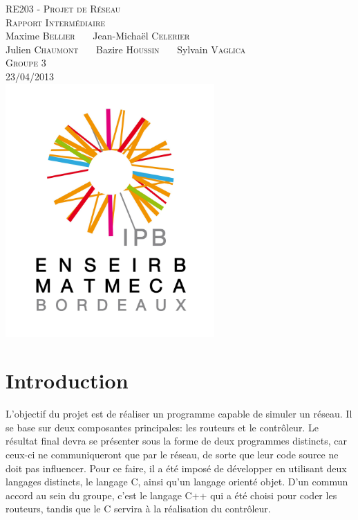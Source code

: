 \documentclass[a4paper,11pt]{article}
\begin{document}
\begin{titlepage}
  \begin{center}

    \textsc{\LARGE RE203 - Projet de Réseau}\\[2cm]
    \textsc{\large Rapport Intermédiaire}\\[3cm]
    Maxime \textsc{Bellier} \ \ \ Jean-Michaël \textsc{Celerier}\\
    Julien \textsc{Chaumont} \ \ \ Bazire \textsc{Houssin} \ \ \ Sylvain \textsc{Vaglica}\\[1cm]
    \textsc{Groupe 3}\\[1.5cm]
    \textsc{\large 23/04/2013 }\\[1.5cm]
    \includegraphics[width=8cm]{logo.png}

  \end{center}
  \vspace{3cm}

\end{titlepage}

\clearpage


\section*{Introduction}

L'objectif du projet est de réaliser un programme capable de simuler un réseau. Il se base sur deux composantes principales: les routeurs et le contrôleur. Le résultat final devra se présenter sous la forme de deux programmes distincts, car ceux-ci ne communiqueront que par le réseau, de sorte que leur code source ne doit pas influencer. Pour ce faire, il a été imposé de développer en utilisant deux langages distincts, le langage C, ainsi qu'un langage orienté objet. D'un commun accord au sein du groupe, c'est le langage C++ qui a été choisi pour coder les routeurs, tandis que le C servira à la réalisation du contrôleur.
\end{document}

